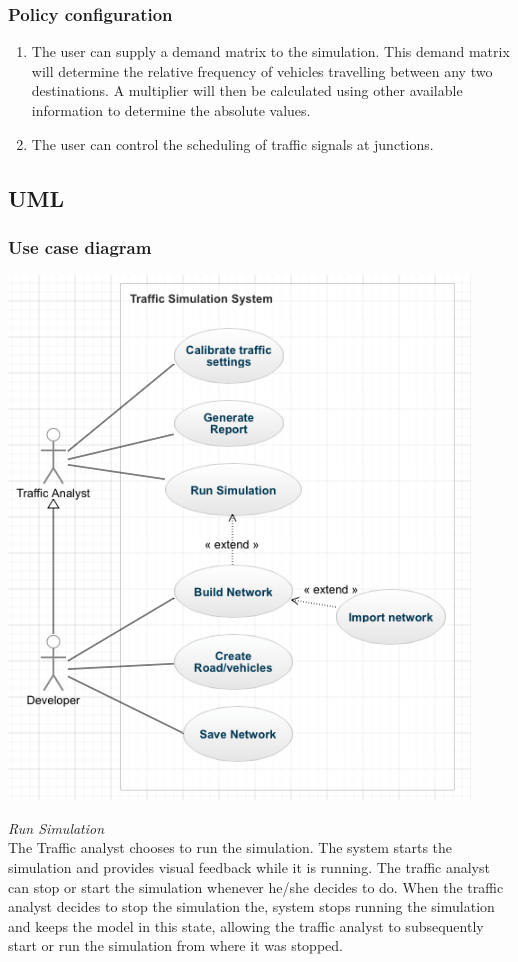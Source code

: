 	\subsubsection{Policy configuration}
	
	\begin{enumerate}
		\item The user can supply a demand matrix to the simulation. This demand matrix will determine the relative frequency of vehicles travelling between any two destinations. A multiplier will then be calculated using other available information to determine the absolute values.
		\item The user can control the scheduling of traffic signals at junctions.
	\end{enumerate}
    \subsection{UML}
    \subsubsection{Use case diagram}
    \includegraphics[scale=0.7]{./images/usecase.png}
    
    
\textit{Run Simulation} \\
The Traffic analyst chooses to run the simulation. The system starts the simulation and provides visual feedback while it is running. The traffic analyst can stop or start the simulation whenever he/she decides to do. When the traffic analyst decides to stop the simulation the, system stops running the simulation and keeps the model in this state, allowing the traffic analyst to subsequently start or run the simulation from where it was stopped.\\


